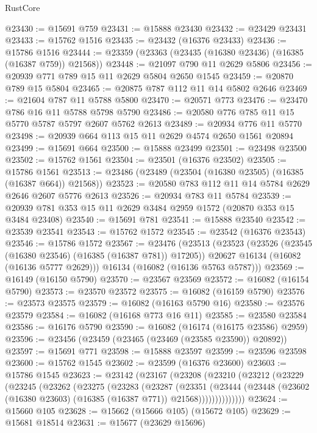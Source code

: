 \begin{lexlean}{RustCore}
\begin{coremodule}
@23430 := @15691 @759
@23431 := @15888 @23430
@23432 := @23429 @23431
@23433 := @15762 @1516
@23435 := @23432 (@16376 @23433)
@23436 := @15786 @1516
@23444 := @23359 (@23363 (@23435 (@16380 @23436) (@16385 (@16387 @759)) @21568))
@23448 := @21097 @790 @11 @2629 @5806
@23456 := @20939 @771 @789 @15 @11 @2629 @5804 @2650 @1545
@23459 := @20870 @789 @15 @5804
@23465 := @20875 @787 @112 @11 @14 @5802 @2646
@23469 := @21604 @787 @11 @5788 @5800
@23470 := @20571 @773
@23476 := @23470 @786 @16 @11 @5788 @5798 @5790
@23486 := @20580 @776 @785 @11 @15 @5770 @5787 @5797 @2607 @5762 @2613
@23489 := @20934 @776 @11 @5770
@23498 := @20939 @664 @113 @15 @11 @2629 @4574 @2650 @1561 @20894
@23499 := @15691 @664
@23500 := @15888 @23499
@23501 := @23498 @23500
@23502 := @15762 @1561
@23504 := @23501 (@16376 @23502)
@23505 := @15786 @1561
@23513 := @23486 (@23489 (@23504 (@16380 @23505) (@16385 (@16387 @664)) @21568))
@23523 := @20580 @783 @112 @11 @14 @5784 @2629 @2646 @2607 @5776 @2613
@23526 := @20934 @783 @11 @5784
@23539 := @20939 @781 @353 @15 @11 @2629 @3484 @2959 @1572 (@20870 @353 @15 @3484 @23408)
@23540 := @15691 @781
@23541 := @15888 @23540
@23542 := @23539 @23541
@23543 := @15762 @1572
@23545 := @23542 (@16376 @23543)
@23546 := @15786 @1572
@23567 := @23476
    (@23513
      (@23523
        (@23526 (@23545 (@16380 @23546) (@16385 (@16387 @781)) @17205))
        @20627
        @16134
        (@16082 (@16136 @5777 @2629)))
      @16134
      (@16082 (@16136 @5763 @5787)))
@23569 := @16149 (@16150 @5790)
@23570 := @23567 @23569
@23572 := @16082 (@16154 @5790)
@23573 := @23570 @23572
@23575 := @16082 (@16159 @5790)
@23576 := @23573 @23575
@23579 := @16082 (@16163 @5790 @16)
@23580 := @23576 @23579
@23584 := @16082 (@16168 @773 @16 @11)
@23585 := @23580 @23584
@23586 := @16176 @5790
@23590 := @16082 (@16174 (@16175 @23586) @2959)
@23596 := @23456 (@23459 (@23465 (@23469 (@23585 @23590)) @20892))
@23597 := @15691 @771
@23598 := @15888 @23597
@23599 := @23596 @23598
@23600 := @15762 @1545
@23602 := @23599 (@16376 @23600)
@23603 := @15786 @1545
@23623 := @23142
    (@23167
      (@23208
        (@23210
          (@23212
            (@23229
              (@23245
                (@23262
                  (@23275
                    (@23283
                      (@23287
                        (@23351
                          (@23444
                            (@23448
                              (@23602 (@16380 @23603) (@16385 (@16387 @771)) @21568))))))))))))))
@23624 := @15660 @105
@23628 := @15662 (@15666 @105) (@15672 @105)
@23629 := @15681 @18514
@23631 := @15677 (@23629 @15696)

\end{coremodule}
\end{lexlean}
